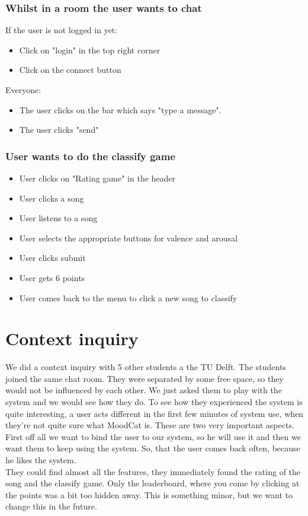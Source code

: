 \subsubsection{Whilst in a room the user wants to chat}
If the user is not logged in yet:
\begin{itemize}
\item Click on "login" in the top right corner
\item Click on the connect button
\end{itemize}
Everyone:
\begin{itemize}
\item The user clicks on the bar which says "type a message".
\item The user clicks "send"
\end{itemize}

\subsubsection{User wants to do the classify game}
\begin{itemize}
\item User clicks on "Rating game" in the header
\item User clicks a song
\item User listens to a song
\item User selects the appropriate buttons for valence and arousal
\item User clicks submit
\item User gets 6 points
\item User comes back to the menu to click a new song to classify
\end{itemize}


\section{Context inquiry}
We did a context inquiry with 5 other students a the TU Delft.
The students joined the same chat room.
They were separated by some free space, so they would not be influenced by each other.
We just asked them to play with the system and we would see how they do.
To see how they experienced the system is quite interesting, a user acts different in the first few minutes of system use, when they're not quite sure what MoodCat is.
These are two very important aspects.
First off all we want to bind the user to our system, so he will use it and then we want them to keep using the system.
So, that the user comes back often, because he likes the system.\\
They could find almost all the features, they immediately found the rating of the song and the classify game.
Only the leaderboard, where you come by clicking at the points was a bit too hidden away.
This is something minor, but we want to change this in the future.

